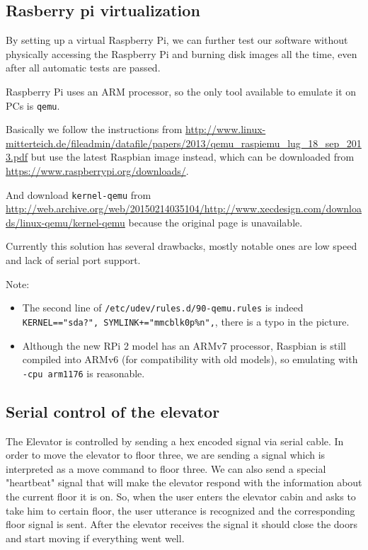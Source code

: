 \documentclass[a4paper, 12pt]{article}
\begin{document}
\subsection{Rasberry pi virtualization}
By setting up a virtual Raspberry Pi, we can further test our software without physically accessing the Raspberry Pi and burning disk images all the time, even after all automatic tests are passed.


Raspberry Pi uses an ARM processor, so the only tool available to emulate it on PCs is \texttt{qemu}.

Basically we follow the instructions from \url{http://www.linux-mitterteich.de/fileadmin/datafile/papers/2013/qemu_raspiemu_lug_18_sep_2013.pdf} but use the latest Raspbian image instead, which can be downloaded from \url{https://www.raspberrypi.org/downloads/}.

And download \texttt{kernel-qemu} from \url{http://web.archive.org/web/20150214035104/http://www.xecdesign.com/downloads/linux-qemu/kernel-qemu} because the original page is unavailable.

Currently this solution has several drawbacks, mostly notable ones are low speed and lack of serial port support.

\vspace{\baselineskip}

Note:

\begin{itemize}
\item The second line of \texttt{/etc/udev/rules.d/90-qemu.rules} is indeed \texttt{KERNEL=="sda?", SYMLINK+="mmcblk0p\%n",}, there is a typo in the picture.
\item Although the new RPi 2 model has an ARMv7 processor, Raspbian is still compiled into ARMv6 (for compatibility with old models), so emulating with \texttt{-cpu arm1176} is reasonable.
\end{itemize}

\subsection{Serial control of the elevator}
The Elevator is controlled by sending a hex encoded signal via serial cable.
In order to move the elevator to floor three, we are sending a signal which is interpreted as a move command to floor three.
We can also send a special "heartbeat" signal that will make the elevator respond with the information about the current floor it is on.
So, when the user enters the elevator cabin and asks to take him to certain floor, the user utterance is recognized and the corresponding floor signal is sent.
After the elevator receives the signal it should close the doors and start moving if everything went well.
\end{document}
